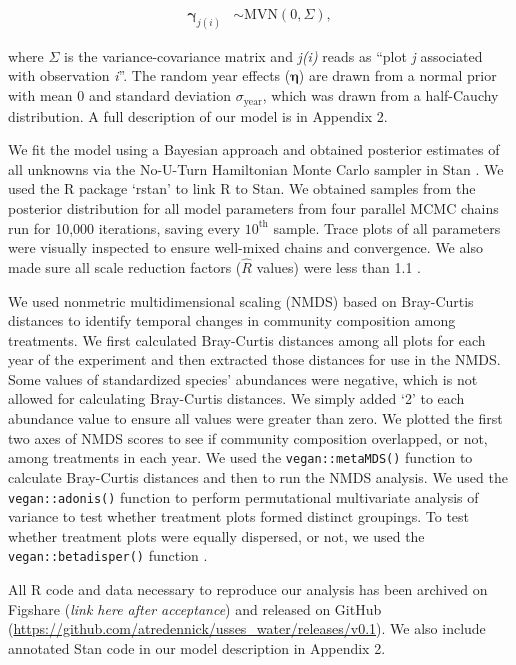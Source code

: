 \documentclass[fleqn,10pt,lineno]{wlpeerj} %
\begin{document}
\vspace{-1em}

\begin{align}
\boldsymbol{\gamma}_{j(i)} &\sim \text{MVN} \left( 0, \Sigma  \right),
\end{align}

\noindent{}where \(\Sigma\) is the variance-covariance matrix and
\emph{j(i)} reads as ``plot \emph{j} associated with observation
\emph{i}''. The random year effects (\(\boldsymbol{\eta}\)) are drawn
from a normal prior with mean 0 and standard deviation
\(\sigma_{\text{year}}\), which was drawn from a half-Cauchy
distribution. A full description of our model is in Appendix 2.

We fit the model using a Bayesian approach and obtained posterior
estimates of all unknowns via the No-U-Turn Hamiltonian Monte Carlo
sampler in Stan \citep{stan2016}. We used the R package `rstan'
\citep{rstan2016} to link R \citep{R2016} to Stan. We obtained samples
from the posterior distribution for all model parameters from four
parallel MCMC chains run for 10,000 iterations, saving every
\(10^{\text{th}}\) sample. Trace plots of all parameters were visually
inspected to ensure well-mixed chains and convergence. We also made sure
all scale reduction factors (\(\hat{R}\) values) were less than 1.1
\citep{Gelman2009}.

We used nonmetric multidimensional scaling (NMDS) based on Bray-Curtis
distances to identify temporal changes in community composition among
treatments. We first calculated Bray-Curtis distances among all plots
for each year of the experiment and then extracted those distances for
use in the NMDS. Some values of standardized species' abundances were
negative, which is not allowed for calculating Bray-Curtis distances. We
simply added `2' to each abundance value to ensure all values were
greater than zero. We plotted the first two axes of NMDS scores to see
if community composition overlapped, or not, among treatments in each
year. We used the \texttt{vegan::metaMDS()} function \citep{Oksanen2016}
to calculate Bray-Curtis distances and then to run the NMDS analysis. We
used the \texttt{vegan::adonis()} function \citep{Oksanen2016} to
perform permutational multivariate analysis of variance to test whether
treatment plots formed distinct groupings. To test whether treatment
plots were equally dispersed, or not, we used the
\texttt{vegan::betadisper()} function \citep{Oksanen2016}.

All R code and data necessary to reproduce our analysis has been
archived on Figshare (\emph{link here after acceptance}) and released on
GitHub (\url{https://github.com/atredennick/usses_water/releases/v0.1}).
We also include annotated Stan code in our model description in Appendix
2.
\end{document}
